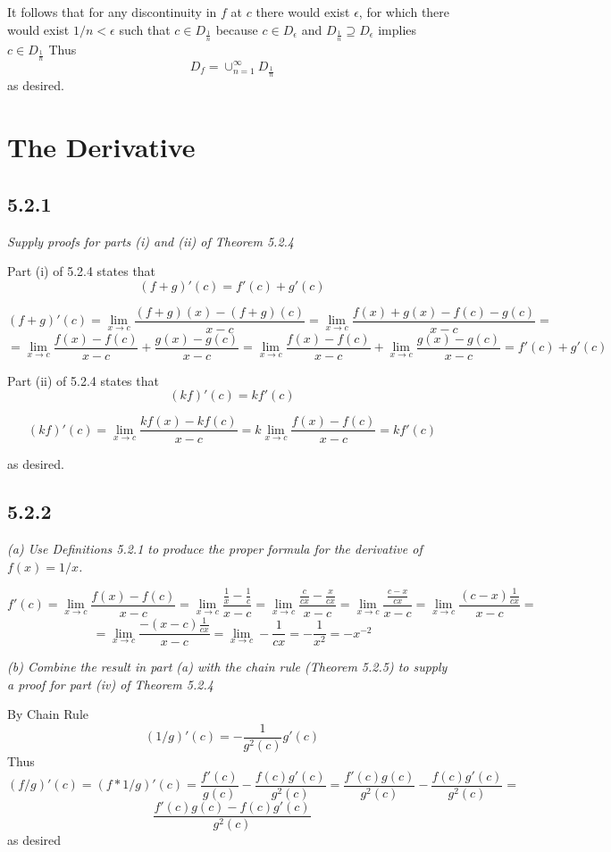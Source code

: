 \documentclass[11pt,oneside,titlepage]{book}
\begin{document}
It follows that for any discontinuity in $f$  at $c$
there would exist $\epsilon$, for which there would exist $1/n < \epsilon$
such that $c \in D_{\frac 1 n}$ because
$c \in D_{\epsilon}$ and $D_{\frac 1 n} \supseteq D_\epsilon$ implies
$c \in  D_{\frac 1 n}$ Thus
$$D_f = \cup_{n = 1}^{\infty}D_{\frac 1 n }$$
as desired.

\chapter{The Derivative}

\section*{5.2.1}
\textit{Supply proofs for parts (i) and (ii) of Theorem 5.2.4}

Part (i)  of 5.2.4 states that
$$(f + g)'(c) = f'(c) + g'(c)$$

$$(f + g)'(c) = \lim_{x \to c}\frac{(f + g)(x) - (f + g)(c)}{x - c} 
= \lim_{x \to c}\frac{f(x) + g(x) - f(c) - g(c)}{x - c} = $$
$$=  \lim_{x \to c}\frac{f(x) - f(c)}{x - c} + \frac{g(x) - g(c)}{x - c} =
\lim_{x \to c}\frac{f(x) - f(c)}{x - c} +
\lim_{x \to c}\frac{g(x) - g(c)}{x - c} = f'(c) + g'(c)
$$

Part (ii) of 5.2.4 states that
$$(kf)'(c) = kf'(c)$$

$$(kf)'(c) = \lim_{x \to c}\frac{kf(x) - kf(c)}{x - c} =
k \lim_{x \to c}\frac{f(x) - f(c)}{x - c} = k f'(c)$$

as desired.

\section*{5.2.2}
\textit{(a) Use Definitions 5.2.1 to produce the proper formula for the
  derivative of $f(x) = 1/x$.}

$$f'(c) = \lim_{x \to c}\frac{f(x) - f(c)}{x - c} =
\lim_{x \to c}\frac{\frac 1 x  - \frac 1 c}{x - c} =
\lim_{x \to c}\frac{\frac{c}{cx}  - \frac{x}{cx}}{x - c} =
\lim_{x \to c}\frac{\frac{c - x}{cx}}{x - c} =
\lim_{x \to c}\frac{(c - x)\frac{1}{cx}}{x - c} =$$
$$ = \lim_{x \to c}\frac{- (x - c)\frac{1}{cx}}{x - c} =
\lim_{x \to c} - \frac{1}{cx} =  - \frac{1}{x^2} = - x^{-2}$$

\textit{(b) Combine the result in part (a) with the chain rule (Theorem 5.2.5)
  to supply a proof for part (iv) of Theorem 5.2.4}

By Chain Rule
$$(1/g)'(c) = -\frac{1}{g^2(c)} g'(c)$$
Thus
$$(f/g)'(c) = (f * 1/g)'(c) =  \frac{f'(c)}{g(c)}  -
\frac{f(c) g'(c)}{g^2(c)}  =
\frac{f'(c)g(c)}{g^2(c)}  - \frac{f(c) g'(c)}{g^2(c)}  = $$
$$\frac{f'(c)g(c) - f(c) g'(c)}{g^2(c)}$$
as desired
\end{document}
